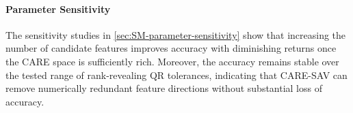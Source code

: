 \documentclass[10pt,reqno]{amsart}
\theoremstyle{remark}
\theoremstyle{definition}
\let\originalparagraph\paragraph
\renewcommand{\paragraph}[1]{\originalparagraph{\textbf{#1}}}
\begin{document}
\begin{table}[htbp]
\centering
\caption{Comparison of relative $L^2$ errors obtained using different
feature families under identical numerical settings, Promotion denotes the percentage reduction in relative $L^2$ error achieved by Ours compared with the second best method.}
\label{tab:feature_family_comparison}
\small
\setlength{\tabcolsep}{6pt}
\renewcommand{\arraystretch}{1.15}
\end{table}

\paragraph{Parameter Sensitivity}
The sensitivity studies in \cref{sec:SM-parameter-sensitivity} show that increasing the number of candidate features improves accuracy with diminishing returns once the CARE space is sufficiently rich. Moreover, the accuracy remains stable over the tested range of rank-revealing QR tolerances, indicating that CARE-SAV can remove numerically redundant feature directions without substantial loss of accuracy.
\end{document}
